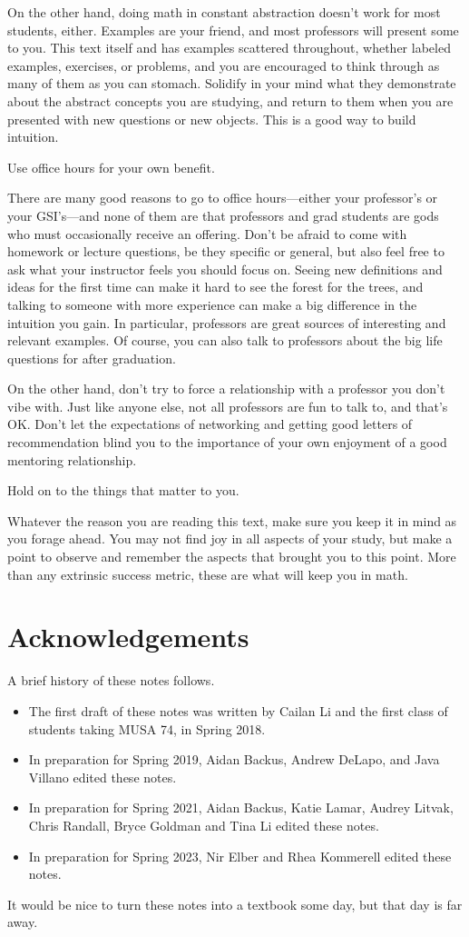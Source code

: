 \documentclass[../main.tex]{subfiles}
\begin{document}
On the other hand, doing math in constant abstraction doesn't work for most students, either. Examples are your friend, and most professors will present some to you. This text itself and has examples scattered throughout, whether labeled examples, exercises, or problems, and you are encouraged to think through as many of them as you can stomach. Solidify in your mind what they demonstrate about the abstract concepts you are studying, and return to them when you are presented with new questions or new objects. This is a good way to build intuition.
\begin{proposition}
    Use office hours for your own benefit.
\end{proposition}
There are many good reasons to go to office hours---either your professor's or your GSI's---and none of them are that professors and grad students are gods who must occasionally receive an offering. Don't be afraid to come with homework or lecture questions, be they specific or general, but also feel free to ask what your instructor feels you should focus on. Seeing new definitions and ideas for the first time can make it hard to see the forest for the trees, and talking to someone with more experience can make a big difference in the intuition you gain. In particular, professors are great sources of interesting and relevant examples. Of course, you can also talk to professors about the big life questions for after graduation.

On the other hand, don't try to force a relationship with a professor you don't vibe with. Just like anyone else, not all professors are fun to talk to, and that's OK. Don't let the expectations of networking and getting good letters of recommendation blind you to the importance of your own enjoyment of a good mentoring relationship.
\begin{theorem}
    Hold on to the things that matter to you.
\end{theorem}
Whatever the reason you are reading this text, make sure you keep it in mind as you forage ahead. You may not find joy in all aspects of your study, but make a point to observe and remember the aspects that brought you to this point. More than any extrinsic success metric, these are what will keep you in math.

\section{Acknowledgements}
A brief history of these notes follows.
\begin{itemize}
    \item The first draft of these notes was written by Cailan Li and the first class of students taking MUSA 74, in Spring 2018.
    \item In preparation for Spring 2019, Aidan Backus, Andrew DeLapo, and Java Villano edited these notes.
    \item In preparation for Spring 2021, Aidan Backus, Katie Lamar, Audrey Litvak, Chris Randall, Bryce Goldman and Tina Li edited these notes.
    \item In preparation for Spring 2023, Nir Elber and Rhea Kommerell edited these notes.
\end{itemize}
It would be nice to turn these notes into a textbook some day, but that day is far away.
\end{document}
